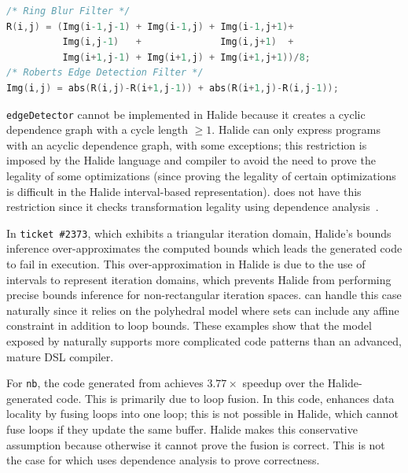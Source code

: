\vspace{-0.15cm}
\begin{lstlisting}[language=C,escapechar=@,numbers=none]
/* Ring Blur Filter */
R(i,j) = (Img(i-1,j-1) + Img(i-1,j) + Img(i-1,j+1)+
          Img(i,j-1)   +              Img(i,j+1)  +
          Img(i+1,j-1) + Img(i+1,j) + Img(i+1,j+1))/8;
/* Roberts Edge Detection Filter */
Img(i,j) = abs(R(i,j)-R(i+1,j-1)) + abs(R(i+1,j)-R(i,j-1));
\end{lstlisting}
\vspace{-0.15cm}

\texttt{edgeDetector} cannot be implemented in Halide because it creates a cyclic dependence graph with a cycle length $\geq 1$.
Halide can only express programs with an acyclic dependence graph, with some exceptions;  this restriction is imposed by the Halide language and compiler to avoid the need to prove the legality of some optimizations (since proving the legality of certain optimizations is difficult in the Halide interval-based representation).
\framework{} does not have this restriction since it checks transformation legality using dependence analysis~\cite{feautrier_dataflow_1991}.

In \texttt{ticket \#2373}, which exhibits a triangular iteration domain,  Halide's bounds inference over-approximates the computed bounds which leads the generated code to fail in execution.  This over-approximation in Halide is due to the use of intervals to represent iteration domains, which prevents Halide from performing precise bounds inference for non-rectangular iteration spaces.  \framework{} can handle this case naturally since it relies on the polyhedral model where sets can include any affine constraint  in addition to loop bounds.  These examples show that the model exposed by \framework{} naturally supports more complicated code patterns than an advanced, mature DSL compiler.

For \texttt{nb}, the code generated from \framework{} achieves $3.77\times$ speedup over the Halide-generated code. This is primarily due to loop fusion.  In this code, \framework{} enhances data locality by fusing loops into one loop;  this is not possible in Halide, which cannot fuse loops if they update the same buffer.  Halide makes this conservative assumption because otherwise it cannot prove the fusion is correct. This is not the case for \framework{} which uses dependence analysis to prove correctness.

